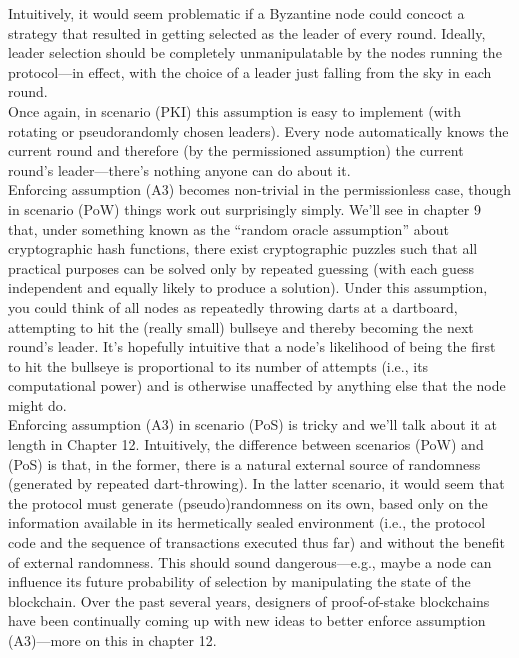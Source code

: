 Intuitively, it would seem problematic if a Byzantine node could concoct a strategy that
resulted in getting selected as the leader of every round. Ideally, leader selection should be
completely unmanipulatable by the nodes running the protocol—in effect, with the choice
of a leader just falling from the sky in each round.\\
Once again, in scenario (PKI) this assumption is easy to implement (with rotating or
pseudorandomly chosen leaders). Every node automatically knows the current round and
therefore (by the permissioned assumption) the current round’s leader—there’s nothing anyone can do about it.\\
Enforcing assumption (A3) becomes non-trivial in the permissionless case, though in
scenario (PoW) things work out surprisingly simply. We’ll see in chapter 9 that, under
something known as the “random oracle assumption” about cryptographic hash functions,
there exist cryptographic puzzles such that all practical purposes can be solved only by repeated guessing (with each guess independent and equally likely to produce a solution).
Under this assumption, you could think of all nodes as repeatedly throwing darts at a dartboard, attempting to hit the (really small) bullseye and thereby becoming the next round’s
leader. It’s hopefully intuitive that a node’s likelihood of being the first to hit the bullseye
is proportional to its number of attempts (i.e., its computational power) and is otherwise
unaffected by anything else that the node might do.\\
Enforcing assumption (A3) in scenario (PoS) is tricky and we’ll talk about it at length
in Chapter 12. Intuitively, the difference between scenarios (PoW) and (PoS) is that, in
the former, there is a natural external source of randomness (generated by repeated
dart-throwing). In the latter scenario, it would seem that the protocol must generate
(pseudo)randomness on its own, based only on the information available in its hermetically
sealed environment (i.e., the protocol code and the sequence of transactions executed thus
far) and without the benefit of external randomness. This should sound dangerous—e.g.,
maybe a node can influence its future probability of selection by manipulating the state of
the blockchain. Over the past several years, designers of proof-of-stake blockchains have
been continually coming up with new ideas to better enforce assumption (A3)—more on this in
chapter 12.\\


